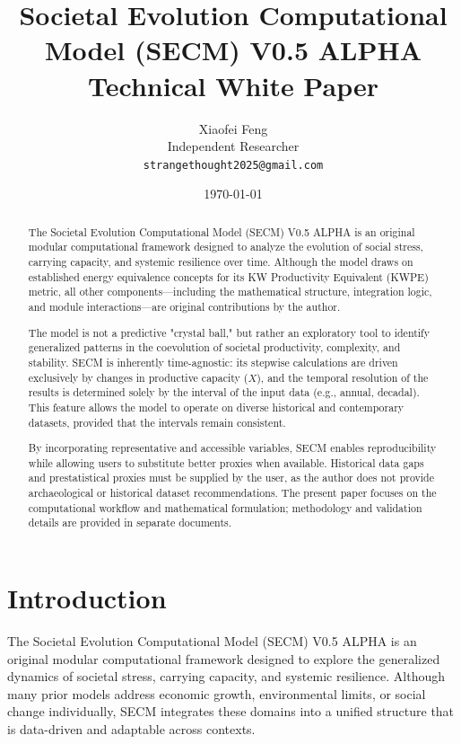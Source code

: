 \documentclass[12pt,a4paper]{article}
\title{\textbf{Societal Evolution Computational Model (SECM) V0.5 ALPHA} \\
\large Technical White Paper}
\author{Xiaofei Feng \\ Independent Researcher \\
\texttt{strangethought2025@gmail.com}}
\date{\today}
\begin{document}
\maketitle
\thispagestyle{empty}

\begin{abstract}
The Societal Evolution Computational Model (SECM) V0.5 ALPHA is an original modular computational framework designed to analyze the evolution of social stress, carrying capacity, and systemic resilience over time. Although the model draws on established energy equivalence concepts for its KW Productivity Equivalent (KWPE) metric, all other components---including the mathematical structure, integration logic, and module interactions---are original contributions by the author.

The model is not a predictive "crystal ball," but rather an exploratory tool to identify generalized patterns in the coevolution of societal productivity, complexity, and stability. SECM is inherently time-agnostic: its stepwise calculations are driven exclusively by changes in productive capacity (\(X\)), and the temporal resolution of the results is determined solely by the interval of the input data (e.g., annual, decadal). This feature allows the model to operate on diverse historical and contemporary datasets, provided that the intervals remain consistent.

By incorporating representative and accessible variables, SECM enables reproducibility while allowing users to substitute better proxies when available. Historical data gaps and prestatistical proxies must be supplied by the user, as the author does not provide archaeological or historical dataset recommendations. The present paper focuses on the computational workflow and mathematical formulation; methodology and validation details are provided in separate documents.

\end{abstract}

\newpage
\tableofcontents
\newpage
\section{Introduction}

The Societal Evolution Computational Model (SECM) V0.5 ALPHA is an original modular computational framework designed to explore the generalized dynamics of societal stress, carrying capacity, and systemic resilience. Although many prior models address economic growth, environmental limits, or social change individually, SECM integrates these domains into a unified structure that is data-driven and adaptable across contexts.
\end{document}
